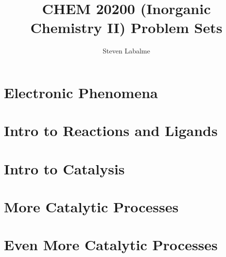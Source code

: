 \documentclass[titlepage]{article}
\title{CHEM 20200 (Inorganic Chemistry II) Problem Sets}
\author{Steven Labalme}
\begin{document}
\maketitle



\tableofcontents
\newpage



\pagestyle{main}
\renewcommand{\leftmark}{Homework \thesection}
\section{Electronic Phenomena}

\newpage



\section{Intro to Reactions and Ligands}

\newpage



\section{Intro to Catalysis}

\newpage



\section{More Catalytic Processes}

\newpage



\section{Even More Catalytic Processes}

\newpage



\renewcommand{\leftmark}{References}
\printbibliography[heading=bibintoc]
\end{document}
